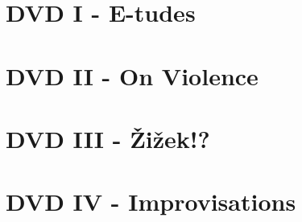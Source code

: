 \section*{DVD I - E-tudes}

\section*{DVD II - On Violence}

\section*{DVD III - \v{Z}i\v{z}ek!?}

\section*{DVD IV - Improvisations}

